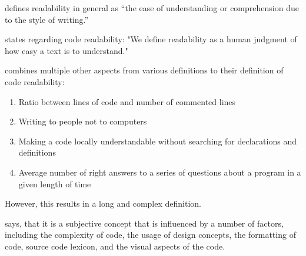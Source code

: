 \documentclass[%
class=scrreprt,
chapterprefix=false,%
open=right,%
twoside=false,%
paper=a4,%
logofile={Logo\_zentral\_farbig\_EN.png},%
thesistype=master,%
UKenglish,%
]{se2thesis}
\begin{document}
	\citeauthor{klare1964measurement} defines readability in general as “the ease of understanding or comprehension due to the style of writing.” 
	
	\citeauthor{buse2009learning} states regarding code readability: "We define readability as a human judgment of how easy a
	text is to understand."

	\citeauthor{tashtoush2013impact} combines multiple other aspects from various definitions to their definition of code readability:
	\begin{enumerate}
		\item Ratio between lines of code and number of commented lines
		\item Writing to people not to computers
		\item Making a code locally understandable without searching for declarations and definitions
		\item Average number of right answers to a series of questions about a program in a given length of time
	\end{enumerate}	
	However, this results in a long and complex definition.
	
	\citeauthor{scalabrino2018comprehensive} says, that it is a subjective concept that is influenced by a number of factors, including the complexity of code, the usage of design concepts, the formatting of code, source code lexicon, and the visual aspects of the code.
	
\end{document}
